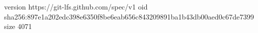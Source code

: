 version https://git-lfs.github.com/spec/v1
oid sha256:897e1a202edc398e6350f8be6eab656c843209891ba1b43db00aed0c67de7399
size 4071
